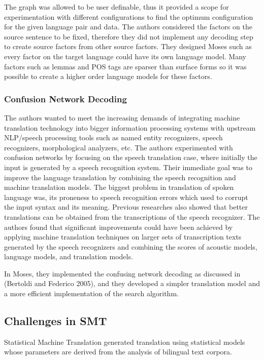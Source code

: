 The graph was allowed to be user definable, thus it provided a scope for experimentation with different configurations to find the optimum configuration for the given language pair and data. The authors considered the factors on the source sentence to be fixed, therefore they did not implement any decoding step to create source factors from other source factors. They designed Moses such as every factor on the target language could have its own language model.  Many factors such as lemmas and POS tags are sparser than surface forms so it was possible to create a higher order language models for these factors.

\subsubsection{Confusion Network Decoding}
The authors wanted to meet the increasing demands of integrating machine translation technology into bigger information processing systems with upstream NLP/speech processing tools such as named entity recognizers, speech recognizers, morphological analyzers, etc. The authors experimented with confusion networks by focusing on the speech translation case, where initially the input is generated by a speech recognition system. Their immediate goal was to improve the language translation by combining the speech recognition and machine translation models. The biggest problem in translation of spoken language was, its proneness to speech recognition errors which used to corrupt the input syntax and its meaning. Previous researches also showed that better translations can be obtained from the transcriptions of the speech recognizer.  The authors found that significant improvements could have been achieved by applying machine translation techniques on larger sets of transcription texts generated by the speech recognizers and combining the scores of acoustic models, language models, and translation models. 

In Moses, they implemented the confusing network decoding as discussed in (Bertoldi and Federico 2005), and they developed a simpler translation model and a more efficient implementation of the search algorithm.

\subsection{Challenges in SMT}

Statistical Machine Translation generated translation using statistical models whose parameters are derived from the analysis of bilingual text corpora. 

